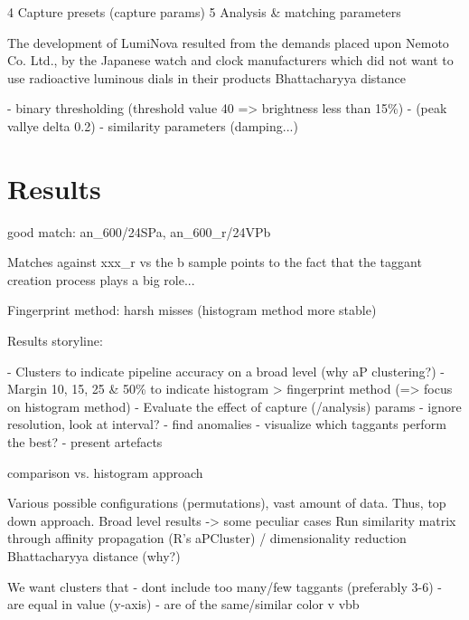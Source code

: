 \documentclass[thesis.tex]{subfiles}
\begin{document}
4 Capture presets (capture params)
5 Analysis \& matching parameters


The development of LumiNova resulted from the demands placed upon Nemoto  Co. Ltd.,  by the Japanese watch and clock manufacturers which did not want to use radioactive luminous dials in their products
Bhattacharyya distance

- binary thresholding (threshold value 40 => brightness less than 15\%)
- (peak vallye delta 0.2)
- similarity parameters (damping...)

\section{Results}
\label{chapter:results}

good match: an\_600/24SPa, an\_600\_r/24VPb

Matches against xxx\_r vs the b sample points to the fact that the taggant creation process plays a big role...

Fingerprint method: harsh misses (histogram method more stable)

Results storyline:

- Clusters to indicate pipeline accuracy on a broad level (why aP clustering?)
- Margin 10, 15, 25 \& 50\% to indicate histogram > fingerprint method (=> focus on histogram method)
- Evaluate the effect of capture (/analysis) params
  - ignore resolution, look at interval?
  - find anomalies
  - visualize which taggants perform the best?
- present artefacts

comparison vs. histogram approach

Various possible configurations (permutations), vast amount of data. Thus, top down approach. Broad level results -> some peculiar cases
Run similarity matrix through affinity propagation (R's aPCluster) / dimensionality reduction
Bhattacharyya distance (why?)

We want clusters that
- dont include too many/few taggants (preferably 3-6)
- are equal in value (y-axis)
- are of the same/similar color
v vbb
\end{document}
